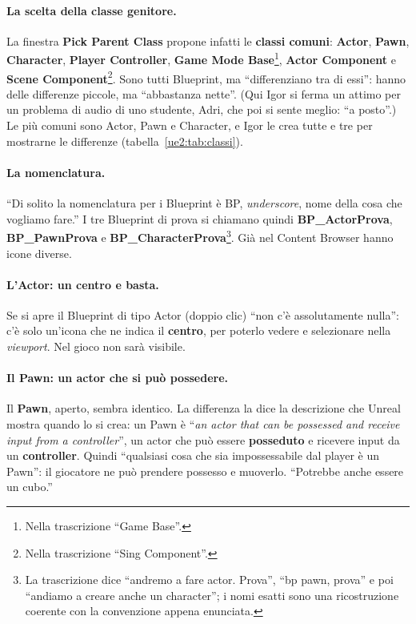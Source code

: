 \paragraph{La scelta della classe genitore.} La finestra \textbf{Pick Parent Class}
propone infatti le \textbf{classi comuni}: \textbf{Actor}, \textbf{Pawn},
\textbf{Character}, \textbf{Player Controller}, \textbf{Game Mode
Base}\footnote{Nella trascrizione ``Game Base''.}, \textbf{Actor Component} e
\textbf{Scene Component}\footnote{Nella trascrizione ``Sing Component''.}. Sono tutti
Blueprint, ma ``differenziano tra di essi'': hanno delle differenze piccole, ma
``abbastanza nette''. (Qui Igor si ferma un attimo per un problema di audio di uno
studente, Adri, che poi si sente meglio: ``a posto''.) Le più comuni sono Actor, Pawn e Character, e Igor le crea tutte e
tre per mostrarne le differenze (tabella~\ref{ue2:tab:classi}).

\paragraph{La nomenclatura.} ``Di solito la nomenclatura per i Blueprint è BP,
\emph{underscore}, nome della cosa che vogliamo fare.'' I tre Blueprint di prova si
chiamano quindi \textbf{BP\_\allowbreak ActorProva}, \textbf{BP\_\allowbreak PawnProva} e
\textbf{BP\_\allowbreak CharacterProva}\footnote{La trascrizione dice ``andremo a fare actor.
Prova'', ``bp pawn, prova'' e poi ``andiamo a creare anche un character''; i nomi esatti
sono una ricostruzione coerente con la convenzione appena enunciata.}. Già nel
Content Browser hanno icone diverse.

\paragraph{L'Actor: un centro e basta.} Se si apre il Blueprint di tipo Actor (doppio
clic) ``non c'è assolutamente nulla'': c'è solo un'icona che ne indica il
\textbf{centro}, per poterlo vedere e selezionare nella \emph{viewport}. Nel gioco non
sarà visibile.

\paragraph{Il Pawn: un actor che si può possedere.} Il \textbf{Pawn}, aperto, sembra
identico. La differenza la dice la descrizione che Unreal mostra quando lo si crea: un
Pawn è ``\emph{an actor that can be possessed and receive input from a controller}'',
un actor che può essere \textbf{posseduto} e ricevere input da un
\textbf{controller}. Quindi ``qualsiasi cosa che sia impossessabile dal player è un
Pawn'': il giocatore ne può prendere possesso e muoverlo. ``Potrebbe anche essere un
cubo.''

